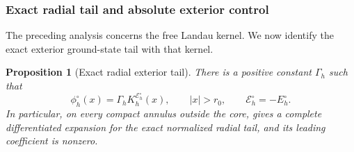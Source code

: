 \documentclass[11pt]{article}
\newtheorem{proposition}[theorem]{Proposition}
\newcommand{\cE}{\mathcal E}
\begin{document}
\subsubsection{Exact radial tail and absolute exterior control}
The preceding analysis concerns the free Landau kernel.  We now identify the exact exterior ground-state tail with that kernel.
\begin{proposition}[Exact radial exterior tail]\label{prop:exact-radial-tail}
There is a positive constant $\Gamma_h$ such that
\begin{equation}\label{eq:radial-tail}
 \phi_h^\circ(x)=\Gamma_hK_h^{\cE_h^\circ}(x),
 \qquad |x|>r_0,
 \qquad \cE_h^\circ=-E_h^\circ.
\end{equation}
In particular, on every compact annulus outside the core,  gives a complete differentiated expansion for the exact normalized radial tail, and its leading coefficient is nonzero.
\end{proposition}
\end{document}
